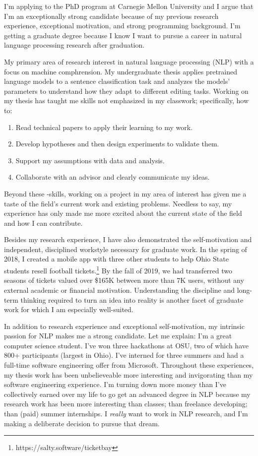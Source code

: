 \documentclass[11pt,letterpaper]{letter}
\begin{document}
I'm applying to the PhD program at Carnegie Mellon University and I argue that I'm an exceptionally strong candidate because of my previous research experience, exceptional motivation, and strong programming background.
I'm getting a graduate degree because I know I want to pursue a career in natural language processing research after graduation.

My primary area of research interest in natural language processing (NLP) with a focus on machine comphrension.
My undergraduate thesis applies pretrained language models to a sentence classification task and analyzes the models' parameters to understand how they adapt to different editing tasks.
Working on my thesis has taught me skills not emphasized in my classwork; specifically, how to:

\begin{enumerate}
  \item Read technical papers to apply their learning to my work.
  \item Develop hypotheses and then design experiments to validate them.
  \item Support my assumptions with data and analysis.
  \item Collaborate with an advisor and clearly communicate my ideas.
\end{enumerate}

Beyond these -skills, working on a project in my area of interest has given me a taste of the field's current work and existing problems. 
Needless to say, my experience has only made me more excited about the current state of the field and how I can contribute.

Besides my research experience, I have also demonstrated the self-motivation and independent, disciplined workstyle necessary for graduate work.
In the spring of 2018, I created a mobile app with three other students to help Ohio State students resell football tickets.\footnote{https://salty.software/ticketbay}
By the fall of 2019, we had transferred two seasons of tickets valued over \$165K between more than 7K users, without any external academic or financial motivation.
Understanding the discipline and long-term thinking required to turn an idea into reality is another facet of graduate work for which I am especially well-suited.

In addition to research experience and exceptional self-motivation, my intrinsic passion for NLP makes me a strong candidate.
Let me explain: I'm a great computer science student.
I've won three hackathons at OSU, two of which have 800+ participants (largest in Ohio).
I've interned for three summers and had a full-time software engineering offer from Microsoft.
Throughout these experiences, my thesis work has been unbelieveable more interesting and invigorating than my software engineering experience.
I'm turning down more money than I've collectively earned over my life to go get an advanced degree in NLP because my research work has been more interesting than classes; than freelance developing; than (paid) summer internships.
I \textit{really} want to work in NLP research, and I'm making a deliberate decision to pursue that dream.
\end{document}
